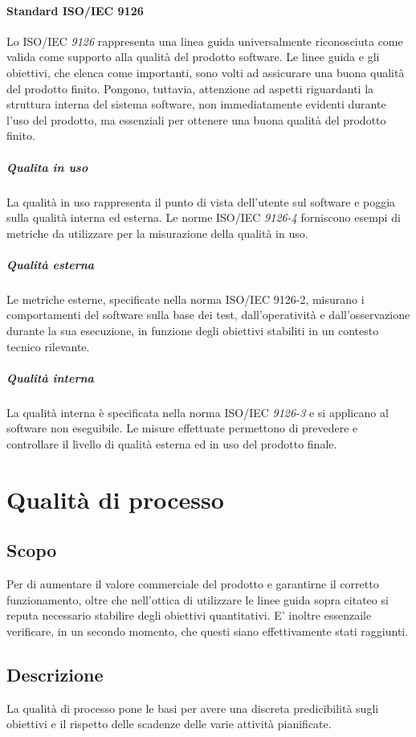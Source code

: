 \documentclass[12pt,a4paper]{article}
\begin{document}
\paragraph{Standard ISO/IEC 9126}

Lo ISO/IEC \textit{9126} rappresenta una linea guida universalmente riconosciuta come valida come supporto alla qualità del prodotto software. Le linee guida e gli obiettivi, che elenca come importanti, sono volti ad assicurare una buona qualità del prodotto finito. Pongono, tuttavia, attenzione ad aspetti riguardanti la struttura interna del sistema software, non immediatamente evidenti durante l'uso del prodotto, ma essenziali per ottenere una buona qualità del prodotto finito.
\subparagraph{Qualita in uso}
La qualità in uso rappresenta il punto di vista dell'utente sul software e poggia sulla qualità interna ed esterna. Le norme ISO/IEC \textit{9126-4} forniscono esempi di metriche da utilizzare per la misurazione della qualità in uso.
\subparagraph{Qualità esterna}
Le metriche esterne, specificate nella norma ISO/IEC 9126-2, misurano i comportamenti del software sulla base dei test, dall'operatività e dall'osservazione durante la sua esecuzione, in funzione degli obiettivi stabiliti in un contesto tecnico rilevante.
\subparagraph{Qualità interna}
La qualità interna è specificata nella norma ISO/IEC \textit{9126-3} e si applicano al software non eseguibile. Le misure effettuate permettono di prevedere e controllare il livello di qualità esterna ed in uso del prodotto finale.



\section{Qualità di processo}
\subsection{Scopo}
Per di aumentare il valore commerciale del prodotto e garantirne il corretto funzionamento, oltre che nell'ottica di  utilizzare le linee guida sopra citateo  si reputa necessario stabilire degli obiettivi quantitativi. E' inoltre essenzaile verificare, in un secondo momento, che questi siano effettivamente stati raggiunti.
\subsection{Descrizione}
La qualità di processo pone le basi per avere una discreta predicibilità sugli obiettivi e il rispetto delle scadenze delle varie attività pianificate.
\end{document}
